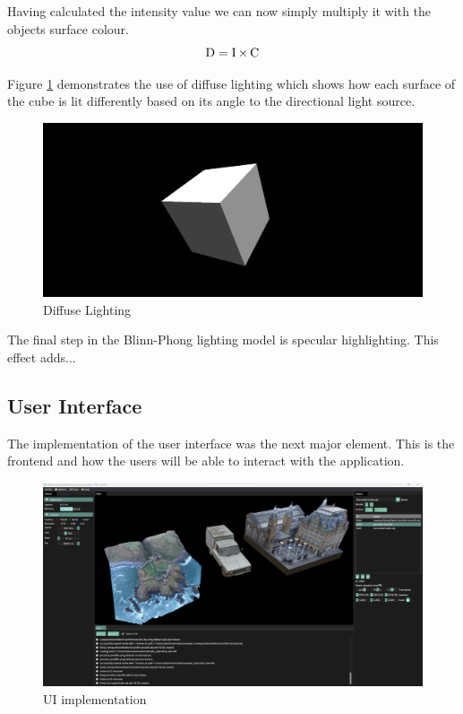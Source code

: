 \documentclass[11pt]{article}
\begin{document}
Having calculated the intensity value we can now simply multiply it with the objects
surface colour.
\begin{equation}
	\operatorname{D} = \operatorname{I} \times \operatorname{C}
\end{equation}

Figure \ref{fig:diffuse} demonstrates the use of diffuse lighting which shows how each
surface of the cube is lit differently based on its angle to the directional light 
source. 
\begin{figure}[h!]
  \centering
  \includegraphics[width=\textwidth]{images/diffuse_lighting.png}
  \caption{Diffuse Lighting}
  \label{fig:diffuse}
\end{figure}


The final step in the Blinn-Phong lighting model is specular highlighting. This effect
adds...


\subsection{User Interface}
The implementation of the user interface was the next major element. This is
the frontend and how the users will be able to interact with the application.

\begin{figure}[h!]
  \centering
  \includegraphics[width=\textwidth]{images/ui_implementation.png}
  \caption{UI implementation}
  \label{fig:user_interface}
\end{figure}
\end{document}
